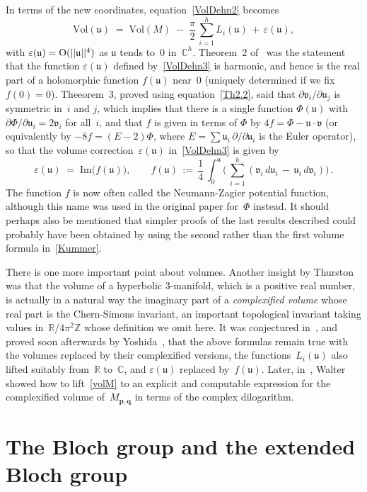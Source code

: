 \documentclass[12pt,reqno]{amsart}
\theoremstyle{definition}
\def\Vol{\mathrm{Vol}}
\def\={\;=\;}
\def\+{\,+\,}
\def\be{\begin{equation}}
\def\ee{\end{equation}}
\newcommand{\mb}{\mathbf}
\def\R{\mathbb R}
\def\C{\mathbb C}
\def\Z{\mathbb Z}
\def\O{\text O}
\def\bp{\mb p}  \def\bq{\mb q}  \def\bz{\mb z} \def\bw{\mb w}
\def\Im{\mathrm{Im}}
\def\ve{\varepsilon}
\def\fu{\mathfrak u}   %
\def\fv{\mathfrak v}   %
\begin{document}
In terms of the new coordinates, equation~\eqref{VolDehn2} becomes
\be
\label{VolDehn3} 
\Vol(\fu) \= \Vol(M) \;-\;\frac\pi 2\,\sum_{i=1}^h L_i(\fu) \+ \ve(\fu),  
\ee
with $\ve(\fu)=\O(||\fu||^4)$ as $\fu$ tends to~0 in~$\C^h$. 
Theorem~2 of~\cite{NZ} was the statement that the function $\ve(\fu)$ defined 
by~\eqref{VolDehn3}
is harmonic, and hence is the real part of a holomorphic function $f(\fu)$ near~0 (uniquely
determined if we fix~$f(0)=0$).  
Theeorem~3, proved using equation~\eqref{Th2.2}, said that $\partial\fv_i/\partial\fu_j$ 
is symmetric in~$i$ and $j$, which implies that there is a single function $\Phi(\fu)$ with
$\partial\Phi/\partial\fu_i=2\fv_i$ for all~$i$, and that $f$ is given in terms of $\Phi$ by 
$4f=\Phi-\fu\cdot\fv$ (or equivalently by $-8f=(E-2)\Phi$, where
$E=\sum\fu_i\,\partial/\partial\fu_i$
is the Euler operator), so that the volume correction~$\ve(\fu)$ in~\eqref{VolDehn3} is
given by
\be
\label{VolDehn4}
\ve(\fu) \= \Im\bigl(f(\fu)\bigr),
\qquad f(\fu)\,:=\,\frac14\,\int_0^\fu
\biggl(\,\sum_{i=1}^h(\fv_i\,d\fu_i\,-\,\fu_i\,d\fv_i)\biggr)\,.
\ee
The function $f$ is now often called the Neumann-Zagier potential function, although
this name was used in the original paper for~$\Phi$ instead.  It should perhaps also be
mentioned that simpler proofs of the last results described could probably have been
obtained by using the second rather than the first volume formula in~\eqref{Kummer}.

There is one more important point about volumes. Another insight by Thurston was that the
volume of a hyperbolic 3-manifold, which is a positive real number, is  actually in a
natural way the imaginary part of a {\it complexified volume} whose real part is the
Chern-Simons invariant, an important topological 
invariant taking values in~$\R/4\pi^2\Z$ whose definition we omit here.
It was  conjectured in~\cite{NZ}, and proved soon afterwards by Yoshida~\cite{Yosh},
that the above formulas remain true with the volumes replaced by their complexified 
versions, the functions~$L_i(\fu)$ also lifted suitably from~$\R$ to~$\C$, and $\ve(\fu)$
replaced by~$f(\fu)$.  Later, in~\cite{N:combinatorics}, Walter showed how to
lift~\eqref{volM} to an explicit and computable expression for the complexified volume
of~$M_{\bp,\bq}$ in terms of the complex dilogarithm. 


\section{The Bloch group and the extended Bloch group} 
\label{sec.4}
\end{document}
